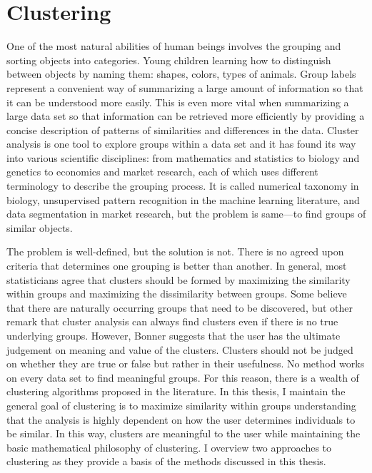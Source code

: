 \documentclass[12pt]{article}
\begin{document}
\section{Clustering}
One of the most natural abilities of human beings involves the grouping and sorting objects into categories. Young children learning how to distinguish between objects by naming them: shapes, colors, types of animals. Group labels represent a convenient way of summarizing a large amount of information so that it can be understood more easily. This is even more vital when summarizing a large data set so that information can be retrieved more efficiently by providing a concise description of patterns of similarities and differences in the data. Cluster analysis is one tool to explore groups within a data set and it has found its way into various scientific disciplines: from mathematics and statistics to biology and genetics to economics and market research, each of which uses different terminology to describe the grouping process. It is called numerical taxonomy in biology, unsupervised pattern recognition in the machine learning literature, and data segmentation in market research, but the problem is same---to find groups of similar objects.

The problem is well-defined, but the solution is not. There is no agreed upon criteria that determines one grouping is better than another. In general, most statisticians agree that clusters should be formed by maximizing the similarity within groups and maximizing the dissimilarity between groups. Some believe that there are naturally occurring groups that need to be discovered, but other remark that cluster analysis can always find clusters even if there is no true underlying groups. However, Bonner \cite{bonner1964} suggests that the user has the ultimate judgement on meaning and value of the clusters. Clusters should not be judged on whether they are true or false but rather in their usefulness. No method works on every data set to find meaningful groups. For this reason, there is a wealth of clustering algorithms proposed in the literature. In this thesis, I maintain the general goal of clustering is to maximize similarity within groups understanding that the analysis is highly dependent on how the user determines individuals to be similar. In this way, clusters are meaningful to the user while maintaining the basic mathematical philosophy of clustering.  I overview two approaches to clustering as they provide a basis of the methods discussed in this thesis. 
\end{document}
